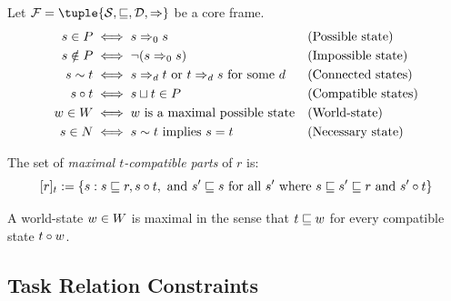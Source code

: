 \documentclass[../LogosReference.tex]{subfiles}
\begin{document}
\begin{definition}\label{def:state-modality}
	Let $\mframe = \tuple{\statespace, \parthood, \temporalorder, \taskrel}$ be a core frame.
	\begin{align}
		s \in P    & \iff s \Rightarrow_{0} s                                                &  & \text{(Possible state)}    \\
		s \notin P & \iff \neg(s \Rightarrow_{0} s)                                          &  & \text{(Impossible state)}  \\
		s \sim t     & \iff s \Rightarrow_{d} t \text{ or } t \Rightarrow_{d} s \text{ for some } d &  & \text{(Connected states)}  \\
		s \circ t    & \iff s\sqcup t \in P                                   &  & \text{(Compatible states)} \\
		w \in W & \iff w \text{ is a maximal possible state}                         &  & \text{(World-state)}       \\
		s \in N   & \iff s \sim t \text{ implies } s = t                         &  & \text{(Necessary state)}
	\end{align}
\end{definition}

\begin{definition}\label{def:maximal-compatible}
	The set of \emph{maximal $t$-compatible parts} of $r$ is:
	\[
		[r]_{t} := \{s : s \sqsubseteq r, s \circ t, \text{ and } s' \sqsubseteq s \text{ for all } s' \text{ where } s \sqsubseteq s' \sqsubseteq r \text{ and } s' \circ t\}
	\]
\end{definition}

\begin{remark}
	A world-state $w \in W$ is maximal in the sense that $t \sqsubseteq w$ for every compatible state $t \circ w$.
\end{remark}


\subsection{Task Relation Constraints}\label{sec:task-constraints}
\end{document}

